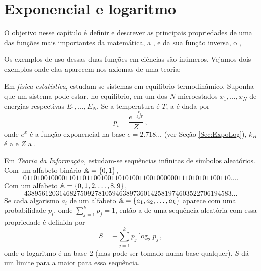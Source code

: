 

\chapter{Exponencial e logaritmo}\label{CAP:ExponLog}

\ifdefined\updateans
\fi


O objetivo nesse capítulo é definir e descrever as principais
propriedades de uma das funções mais importantes da matemática, a
, 
e da sua função inversa, o ,

Os exemplos de uso dessas duas funções em ciências são inúmeros. Vejamos dois
exemplos onde elas aparecem nos axiomas de uma teoria:

\begin{ex}\label{Ex:Fisstat}
Em \emph{física estatística}, estudam-se sistemas em equilíbrio termodinâmico. 
Suponha que um sistema pode estar, no equilíbrio, em 
um dos $N$ microestados $x_1,\dots,x_N$ de energias respectivas $E_1,\dots,E_N$.
Se a temperatura é $T$, a  é
dada por 
$$p_i=\frac{e^{-\tfrac{E_i}{k_BT}}}{Z}\,,$$
onde $e^x$ é a função exponencial na base $e=2.718...$ (ver Seção
\ref{Sec:ExpoLog}), $k_B$ é a  e $Z$ a
.
\end{ex}

\begin{ex}
Em \emph{Teoria da Informação,} estudam-se sequências
infinitas de símbolos
aleatórios. Com um alfabeto binário $\mathbb{A}=\{0,1\}$,
$$01101001000011011011001001101010011001000000111010101100110....$$
Com um alfabeto $\mathbb{A}=\{0,1,2,\dots,8,9\}$,
$$43895612031468275092781059463897360142581974603522706194583...$$
Se cada algarismo $a_i$ de um alfabeto 
$\mathbb{A}=\{a_1,a_2,\dots,a_k\}$ aparece com uma probabilidade $p_i$, onde
$\sum_{j=1}^kp_j=1$, então a  de uma sequência
aleatória com essa propriedade é definida por
$$S=-\sum_{j=1}^kp_j\log_2 p_j\,,$$
onde o logaritmo é na base $2$ (mas pode ser tomado numa base qualquer).
$S$ dá um limite para a maior  para essa sequência.
\end{ex}

